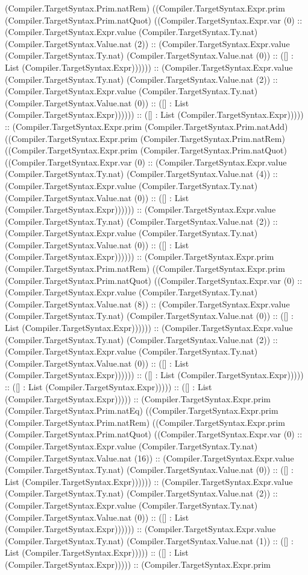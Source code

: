 \documentclass[11pt]{article}
\begin{document}
(Compiler.TargetSyntax.Prim.natRem) ((Compiler.TargetSyntax.Expr.prim (Compiler.TargetSyntax.Prim.natQuot) ((Compiler.TargetSyntax.Expr.var (0) :: (Compiler.TargetSyntax.Expr.value (Compiler.TargetSyntax.Ty.nat) (Compiler.TargetSyntax.Value.nat (2)) :: (Compiler.TargetSyntax.Expr.value (Compiler.TargetSyntax.Ty.nat) (Compiler.TargetSyntax.Value.nat (0)) :: ([] : List (Compiler.TargetSyntax.Expr)))))) :: (Compiler.TargetSyntax.Expr.value (Compiler.TargetSyntax.Ty.nat) (Compiler.TargetSyntax.Value.nat (2)) :: (Compiler.TargetSyntax.Expr.value (Compiler.TargetSyntax.Ty.nat) (Compiler.TargetSyntax.Value.nat (0)) :: ([] : List (Compiler.TargetSyntax.Expr)))))) :: ([] : List (Compiler.TargetSyntax.Expr))))) :: (Compiler.TargetSyntax.Expr.prim (Compiler.TargetSyntax.Prim.natAdd) ((Compiler.TargetSyntax.Expr.prim (Compiler.TargetSyntax.Prim.natRem) ((Compiler.TargetSyntax.Expr.prim (Compiler.TargetSyntax.Prim.natQuot) ((Compiler.TargetSyntax.Expr.var (0) :: (Compiler.TargetSyntax.Expr.value (Compiler.TargetSyntax.Ty.nat) (Compiler.TargetSyntax.Value.nat (4)) :: (Compiler.TargetSyntax.Expr.value (Compiler.TargetSyntax.Ty.nat) (Compiler.TargetSyntax.Value.nat (0)) :: ([] : List (Compiler.TargetSyntax.Expr)))))) :: (Compiler.TargetSyntax.Expr.value (Compiler.TargetSyntax.Ty.nat) (Compiler.TargetSyntax.Value.nat (2)) :: (Compiler.TargetSyntax.Expr.value (Compiler.TargetSyntax.Ty.nat) (Compiler.TargetSyntax.Value.nat (0)) :: ([] : List (Compiler.TargetSyntax.Expr)))))) :: (Compiler.TargetSyntax.Expr.prim (Compiler.TargetSyntax.Prim.natRem) ((Compiler.TargetSyntax.Expr.prim (Compiler.TargetSyntax.Prim.natQuot) ((Compiler.TargetSyntax.Expr.var (0) :: (Compiler.TargetSyntax.Expr.value (Compiler.TargetSyntax.Ty.nat) (Compiler.TargetSyntax.Value.nat (8)) :: (Compiler.TargetSyntax.Expr.value (Compiler.TargetSyntax.Ty.nat) (Compiler.TargetSyntax.Value.nat (0)) :: ([] : List (Compiler.TargetSyntax.Expr)))))) :: (Compiler.TargetSyntax.Expr.value (Compiler.TargetSyntax.Ty.nat) (Compiler.TargetSyntax.Value.nat (2)) :: (Compiler.TargetSyntax.Expr.value (Compiler.TargetSyntax.Ty.nat) (Compiler.TargetSyntax.Value.nat (0)) :: ([] : List (Compiler.TargetSyntax.Expr)))))) :: ([] : List (Compiler.TargetSyntax.Expr))))) :: ([] : List (Compiler.TargetSyntax.Expr))))) :: ([] : List (Compiler.TargetSyntax.Expr))))) :: (Compiler.TargetSyntax.Expr.prim (Compiler.TargetSyntax.Prim.natEq) ((Compiler.TargetSyntax.Expr.prim (Compiler.TargetSyntax.Prim.natRem) ((Compiler.TargetSyntax.Expr.prim (Compiler.TargetSyntax.Prim.natQuot) ((Compiler.TargetSyntax.Expr.var (0) :: (Compiler.TargetSyntax.Expr.value (Compiler.TargetSyntax.Ty.nat) (Compiler.TargetSyntax.Value.nat (16)) :: (Compiler.TargetSyntax.Expr.value (Compiler.TargetSyntax.Ty.nat) (Compiler.TargetSyntax.Value.nat (0)) :: ([] : List (Compiler.TargetSyntax.Expr)))))) :: (Compiler.TargetSyntax.Expr.value (Compiler.TargetSyntax.Ty.nat) (Compiler.TargetSyntax.Value.nat (2)) :: (Compiler.TargetSyntax.Expr.value (Compiler.TargetSyntax.Ty.nat) (Compiler.TargetSyntax.Value.nat (0)) :: ([] : List (Compiler.TargetSyntax.Expr)))))) :: (Compiler.TargetSyntax.Expr.value (Compiler.TargetSyntax.Ty.nat) (Compiler.TargetSyntax.Value.nat (1)) :: ([] : List (Compiler.TargetSyntax.Expr))))) :: ([] : List (Compiler.TargetSyntax.Expr))))) :: (Compiler.TargetSyntax.Expr.prim 
\end{document}
